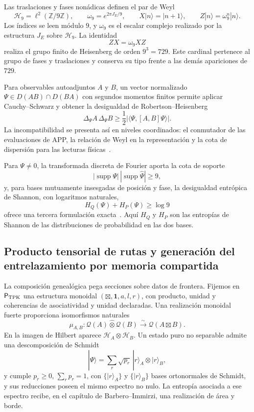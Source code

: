 Las traslaciones y fases nonádicas definen el par de Weyl
\[
 \mathcal H_9=\ell^2(\mathbb Z/9\mathbb Z),
 \qquad
 \omega_9=e^{2\pi J_E/9},
 \qquad
 X|n\rangle=|n+1\rangle,
 \qquad
 Z|n\rangle=\omega_9^n|n\rangle.
\]
Los índices se leen módulo \(9\), y \(\omega_9\) es el escalar complejo
realizado por la estructura \(J_E\) sobre \(\mathcal H_9\).
La identidad
\[
 ZX=\omega_9XZ
\]
realiza el grupo finito de Heisenberg de orden \(9^3=729\). Este cardinal
pertenece al grupo de fases y traslaciones y conserva su tipo frente a las
demás apariciones de \(729\).

Para observables autoadjuntos \(A\) y \(B\), un vector normalizado
\(\Psi\in D(AB)\cap D(BA)\) con segundos momentos finitos permite aplicar
Cauchy--Schwarz y obtener la
desigualdad de Robertson--Heisenberg
\begin{equation}
 \Delta_\Psi A\,\Delta_\Psi B
 \geq\frac12
 \bigl|\langle\Psi,[A,B]\Psi\rangle\bigr|.
 \label{eq:robertson-hmt-rev2}
\end{equation}
La incompatibilidad se presenta así en niveles coordinados: el conmutador de
las evaluaciones de APP, la relación de Weyl en la representación y la cota
de dispersión para las lecturas físicas~\cite{Heisenberg1927,Robertson1929}.

Para \(\Psi\neq0\), la transformada discreta de Fourier aporta la cota de soporte
\[
 |\operatorname{supp}\Psi|\,
 |\operatorname{supp}\widehat\Psi|\geq9,
\]
y, para bases mutuamente insesgadas de posición y fase, la desigualdad
entrópica de Shannon, con logaritmos naturales,
\[
 H_Q(\Psi)+H_P(\Psi)\geq\log9
\]
ofrece una tercera formulación exacta~\cite{MaassenUffink1988}. Aquí
\(H_Q\) y \(H_P\) son las entropías de Shannon de las distribuciones de
probabilidad en las dos bases.

\subsection{Producto tensorial de rutas y generación del entrelazamiento por memoria compartida}

La composición genealógica pega secciones sobre datos de frontera. Fijemos
en \(\mathsf P_{\rm TPK}\) una estructura monoidal
\((\boxtimes,\mathbf 1,a,l,r)\), con producto, unidad y coherencias de
asociatividad y unidad declaradas. Una realización monoidal fuerte
proporciona isomorfismos naturales
\[
 \mu_{A,B}:
 \mathcal Q(A)\widehat\otimes\mathcal Q(B)
 \xrightarrow{\sim}\mathcal Q(A\boxtimes B).
\]
En la imagen de Hilbert aparece
\(\mathcal H_A\otimes\mathcal H_B\). Un estado puro no separable admite una
descomposición de Schmidt
\[
 |\Psi\rangle
 =\sum_r\sqrt{p_r}\,|r\rangle_A\otimes|r\rangle_B,
\]
y cumple \(p_r\geq0\), \(\sum_rp_r=1\), con
\(\{|r\rangle_A\}\) y \(\{|r\rangle_B\}\) bases ortonormales de Schmidt,
y sus reducciones poseen el mismo espectro no nulo. La entropía asociada a
ese espectro recibe, en el capítulo de Barbero--Immirzi, una realización de
área y borde.

